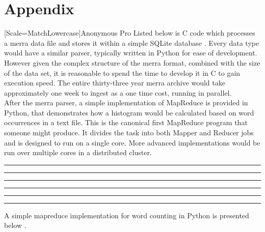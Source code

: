 \section{Appendix}
\newfontfamily{\anonymous}[Scale=MatchLowercase]{Anonymous Pro}
\lstset{ %
    language=C,                             %
    basicstyle=\anonymous,
    tabsize=1,
    breaklines=true,
    breakatwhitespace=false,
    showstringspaces=false,
    showspaces=false,
    showtabs=false
}
Listed below is C code which processes a \gls{merra} data file and stores it within a simple SQLite database \cite{hdf}. Every data type would have a similar parser, typically written in Python for ease of development. However given the complex structure of the \gls{merra} format, combined with the size of the data set, it is reasonable to spend the time to develop it in C to gain execution speed.  The entire thirty-three year \gls{merra} archive would take approximately one week to ingest as a one time cost, running in parallel. \\

After the \gls{merra} parser, a simple implementation of MapReduce is provided in Python, that demonstrates how a histogram would be calculated based on word occurrences in a text file.  This is the canonical first MapReduce program that someone might produce. It divides the task into both Mapper and Reducer jobs and is designed to run on a single core. More advanced implementations would be run over multiple cores in a distributed cluster.
 

\hrule

\hrule

\hrule

\hrule

\hrule

\hrule

\lstset{ %
    language=Python,                             %
    basicstyle=\anonymous,
    tabsize=1,
    breaklines=true,
    breakatwhitespace=false,
    showstringspaces=false,
    showspaces=false,
    showtabs=false
}
A simple mapreduce implementation for word counting in Python is presented below \cite{keller2}.

